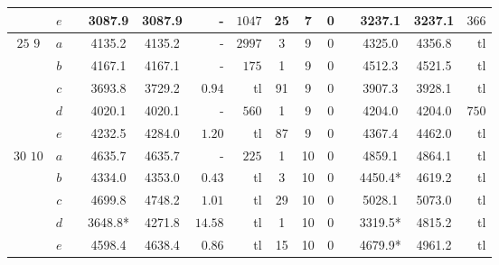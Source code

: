 \begin{table}[!htb]
\begin{tabular}{cccccrrccccccr}
& $e$ & & 3087.9 & 3087.9 & - & $1047$ & 25 & 7 & 0 & & 3237.1 & 3237.1 & $366$ \\
\hline
\multirow{5}{*}{$25$  \hspace{5mm} $9$}
& $a$ & & 4135.2 & 4135.2 & - & $2997$ & 3 & 9 & 0 & & 4325.0 & 4356.8 & tl \\
& $b$ & & 4167.1 & 4167.1 & - & $175$ & 1 & 9 & 0 & & 4512.3 & 4521.5 & tl \\
& $c$ & & 3693.8 & 3729.2 & $0.94$ & tl & 91 & 9 & 0 & & 3907.3 & 3928.1 & tl \\
& $d$ & & 4020.1 & 4020.1 & - & $560$ & 1 & 9 & 0 & & 4204.0 & 4204.0 & $750$ \\
& $e$ & & 4232.5 & 4284.0 & $1.20$ & tl & 87 & 9 & 0 & & 4367.4 & 4462.0 & tl \\
\hline
\multirow{5}{*}{$30$  \hspace{4mm} $10$}
& $a$ & & 4635.7 & 4635.7 & - & $225$ & 1 & 10 & 0 & & 4859.1 & 4864.1 & tl \\
& $b$ & & 4334.0 & 4353.0 & $0.43$ & tl & 3 & 10 & 0 & & 4450.4* & 4619.2 & tl \\
& $c$ & & 4699.8 & 4748.2 & $1.01$ & tl & 29 & 10 & 0 & & 5028.1 & 5073.0 & tl \\
& $d$ & & 3648.8* & 4271.8 & $14.58$ & tl & 1 & 10 & 0 & & 3319.5* & 4815.2 & tl \\
& $e$ & & 4598.4 & 4638.4 & $0.86$ & tl & 15 & 10 & 0 & & 4679.9* & 4961.2 & tl \\
\hline
\end{tabular}
\label{tab:PDPCDxVRPCD-custo40}
\end{table}
